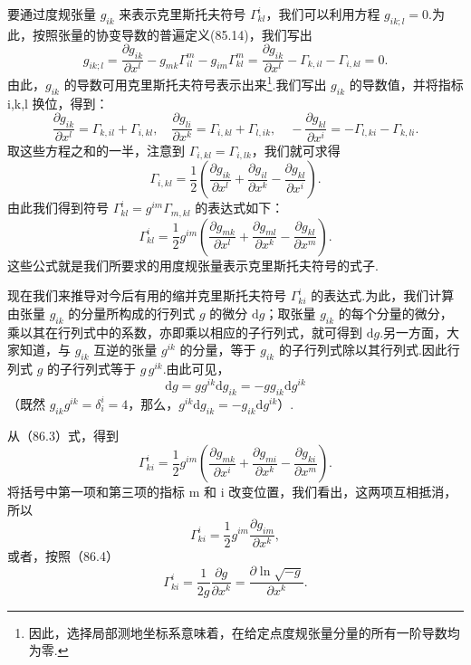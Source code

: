 要通过度规张量 $g_{ik}$ 来表示克里斯托夫符号 $\Gamma^i_{kl}$，我们可以利用方程 $g_{ik;l}=0$.为此，按照张量的协变导数的普遍定义(85.14)，我们写出
\begin{equation*}
  g_{ik;l}=\frac{\partial g_{ik}}{\partial x^l}
  -g_{mk}\Gamma^m_{il}-g_{im}\Gamma^m_{kl}
  =\frac{\partial g_{ik}}{\partial x^l}
  -\Gamma_{k,il}-\Gamma_{i,kl}=0.
\end{equation*}
由此，$g_{ik}$ 的导数可用克里斯托夫符号表示出来\footnote{因此，选择局部测地坐标系意味着，在给定点度规张量分量的所有一阶导数均为零.}.我们写出 $g_{ik}$ 的导数值，并将指标 i,k,l 换位，得到：
\begin{equation*}
  \frac{\partial g_{ik}}{\partial x^l}=\Gamma_{k,il}+\Gamma_{i,kl},
  \quad
  \frac{\partial g_{li}}{\partial x^k}=\Gamma_{i,kl}+\Gamma_{l,ik},
  \quad
  -\frac{\partial g_{kl}}{\partial x^i}=-\Gamma_{l,ki}-\Gamma_{k,li}.
\end{equation*}
取这些方程之和的一半，注意到 $\Gamma_{i,kl}=\Gamma_{i,lk}$，我们就可求得
\begin{equation}
  \Gamma_{i,kl}=\frac{1}{2}\left(\frac{\partial g_{ik}}{\partial x^l}
  +\frac{\partial g_{il}}{\partial x^k}
  -\frac{\partial g_{kl}}{\partial x^i}\right).
\end{equation}
由此我们得到符号 $\Gamma^i_{kl}=g^{im}\Gamma_{m,kl}$ 的表达式如下：
\begin{equation}
  \Gamma^i_{kl}=\frac{1}{2}g^{im}\left(\frac{\partial g_{mk}}{\partial x^l}
  +\frac{\partial g_{ml}}{\partial x^k}
  -\frac{\partial g_{kl}}{\partial x^m}\right).
\end{equation}
这些公式就是我们所要求的用度规张量表示克里斯托夫符号的式子.

现在我们来推导对今后有用的缩并克里斯托夫符号 $\Gamma^i_{ki}$ 的表达式.为此，我们计算由张量 $g_{ik}$ 的分量所构成的行列式 $g$ 的微分 $\mathrm{d}g$；取张量 $g_{ik}$ 的每个分量的微分，乘以其在行列式中的系数，亦即乘以相应的子行列式，就可得到 $\mathrm{d}g$.另一方面，大家知道，与 $g_{ik}$ 互逆的张量 $g^{ik}$ 的分量，等于 $g_{ik}$ 的子行列式除以其行列式.因此行列式 $g$ 的子行列式等于 $g\,g^{ik}$.由此可见，
\begin{equation}
  \mathrm{d}g=gg^{ik}\mathrm{d}g_{ik}
  =-gg_{ik}\mathrm{d}g^{ik}
\end{equation}
（既然 $g_{ik}g^{ik}=\delta^i_i=4$，那么，$g^{ik}\mathrm{d}g_{ik}=-g_{ik}\mathrm{d}g^{ik}$）.

从（86.3）式，得到
\begin{equation*}
  \Gamma^i_{ki}=\frac{1}{2}g^{im}\left(\frac{\partial g_{mk}}{\partial x^i}
  +\frac{\partial g_{mi}}{\partial x^k}
  -\frac{\partial g_{ki}}{\partial x^m}\right).
\end{equation*}
将括号中第一项和第三项的指标 m 和 i 改变位置，我们看出，这两项互相抵消，所以
\begin{equation*}
  \Gamma^i_{ki}=\frac{1}{2}g^{im}\frac{\partial g_{im}}{\partial x^k},
\end{equation*}
或者，按照（86.4）
\begin{equation}
  \Gamma^i_{ki}=\frac{1}{2g}\frac{\partial g}{\partial x^k}
  =\frac{\partial\ln\sqrt{-g}}{\partial x^k}.
\end{equation}

